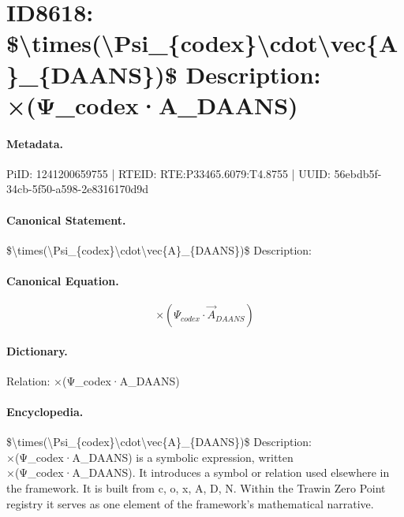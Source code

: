 \section*{ID8618: \$\textbackslash{}times(\textbackslash{}Psi\_\{codex\}\textbackslash{}cdot\textbackslash{}vec\{A\}\_\{DAANS\})\$ Description: ×(Ψ\_codex·A\_DAANS)}
\paragraph{Metadata.}
PiID: 1241200659755 | RTEID: RTE:P33465.6079:T4.8755 | UUID: 56ebdb5f-34cb-5f50-a598-2e8316170d9d

\paragraph{Canonical Statement.}
\$\textbackslash{}times(\textbackslash{}Psi\_\{codex\}\textbackslash{}cdot\textbackslash{}vec\{A\}\_\{DAANS\})\$ Description:

\paragraph{Canonical Equation.}
\[
\times(\Psi_{codex}\cdot\vec{A}_{DAANS})
\]

\paragraph{Dictionary.}
Relation: ×(Ψ\_codex·A\_DAANS)

\paragraph{Encyclopedia.}
\$\textbackslash{}times(\textbackslash{}Psi\_\{codex\}\textbackslash{}cdot\textbackslash{}vec\{A\}\_\{DAANS\})\$ Description: ×(Ψ\_codex·A\_DAANS) is a symbolic expression, written ×(Ψ\_codex·A\_DAANS). It introduces a symbol or relation used elsewhere in the framework. It is built from c, o, x, A, D, N. Within the Trawin Zero Point registry it serves as one element of the framework's mathematical narrative.
